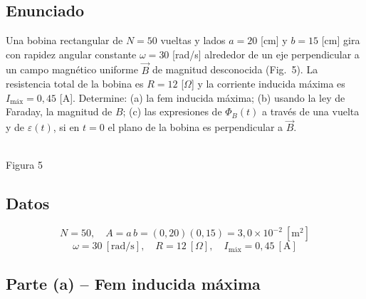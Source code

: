 \documentclass[12pt,letterpaper]{article}
\begin{document}
\subsection*{Enunciado}

Una bobina rectangular de $N = 50$ vueltas y lados $a = 20$ [cm] y $b = 15$ [cm] gira con rapidez
angular constante $\omega = 30$ [rad/s] alrededor de un eje perpendicular a un campo magn\'etico
uniforme $\vec{B}$ de magnitud desconocida (Fig.\ 5). La resistencia total de la bobina es
$R = 12$ [$\Omega$] y la corriente inducida m\'axima es $I_{\text{m\'ax}} = 0{,}45$ [A]. Determine:
(a) la fem inducida m\'axima; (b) usando la ley de Faraday, la magnitud de $B$; (c) las expresiones
de $\Phi_B(t)$ a trav\'es de una vuelta y de $\varepsilon(t)$, si en $t = 0$ el plano de la bobina es
perpendicular a $\vec{B}$.

\begin{center}
\\[2pt]
{\footnotesize Figura 5}
\end{center}

\subsection*{Datos}
\[
    N = 50,\quad A = a\,b = (0{,}20)(0{,}15) = 3{,}0\times10^{-2}\ [\text{m}^2]
\]
\[
    \omega = 30\ [\text{rad/s}],\quad R = 12\ [\Omega],\quad I_{\text{m\'ax}} = 0{,}45\ [\text{A}]
\]

\subsection*{Parte (a) -- Fem inducida m\'axima}
\end{document}
